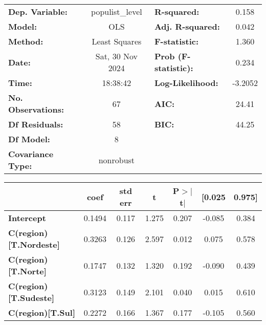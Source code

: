 \begin{center}
\begin{tabular}{lclc}
\toprule
\textbf{Dep. Variable:}        & populist\_level  & \textbf{  R-squared:         } &     0.158   \\
\textbf{Model:}                &       OLS        & \textbf{  Adj. R-squared:    } &     0.042   \\
\textbf{Method:}               &  Least Squares   & \textbf{  F-statistic:       } &     1.360   \\
\textbf{Date:}                 & Sat, 30 Nov 2024 & \textbf{  Prob (F-statistic):} &    0.234    \\
\textbf{Time:}                 &     18:38:42     & \textbf{  Log-Likelihood:    } &   -3.2052   \\
\textbf{No. Observations:}     &          67      & \textbf{  AIC:               } &     24.41   \\
\textbf{Df Residuals:}         &          58      & \textbf{  BIC:               } &     44.25   \\
\textbf{Df Model:}             &           8      & \textbf{                     } &             \\
\textbf{Covariance Type:}      &    nonrobust     & \textbf{                     } &             \\
\bottomrule
\end{tabular}
\begin{tabular}{lcccccc}
                               & \textbf{coef} & \textbf{std err} & \textbf{t} & \textbf{P$> |$t$|$} & \textbf{[0.025} & \textbf{0.975]}  \\
\midrule
\textbf{Intercept}             &       0.1494  &        0.117     &     1.275  &         0.207        &       -0.085    &        0.384     \\
\textbf{C(region)[T.Nordeste]} &       0.3263  &        0.126     &     2.597  &         0.012        &        0.075    &        0.578     \\
\textbf{C(region)[T.Norte]}    &       0.1747  &        0.132     &     1.320  &         0.192        &       -0.090    &        0.439     \\
\textbf{C(region)[T.Sudeste]}  &       0.3123  &        0.149     &     2.101  &         0.040        &        0.015    &        0.610     \\
\textbf{C(region)[T.Sul]}      &       0.2272  &        0.166     &     1.367  &         0.177        &       -0.105    &        0.560     \\

\end{tabular}
\end{center}
